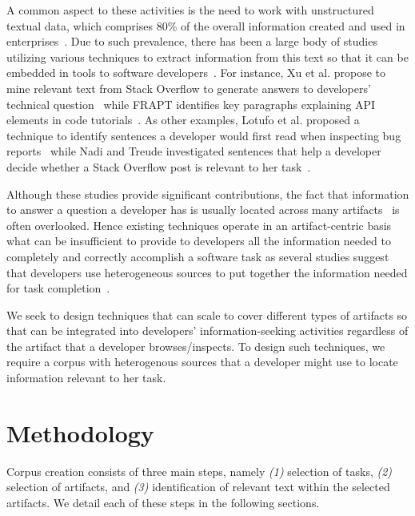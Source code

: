 A common aspect to these activities is the need to work with unstructured textual data, which comprises 80\% of the overall information created and used in enterprises~\cite{Bavota2014, holzinger2013}.
Due to such prevalence, there has been a large body of studies utilizing various techniques to extract
information from this text so that it can be embedded in
tools to software developers~\cite{Bavota2014, Xu2017, Robillard2015, Lotufo2012}. For instance, Xu et al. propose to mine relevant text from Stack Overflow
to generate answers to developers' technical question~\cite{Xu2017}
while FRAPT identifies key paragraphs explaining API elements in code tutorials~\cite{Jiang2017}.
As other examples, Lotufo et al. proposed a technique to identify sentences a developer would first read when inspecting bug reports~\cite{Lotufo2012} while Nadi and Treude investigated sentences that help a developer decide whether a Stack Overflow post is relevant to her task~\cite{nadi2020}.




Although these studies provide significant contributions, the fact that information to answer a question a developer has is usually located across many artifacts~\cite{Rastkar2013t} is often overlooked.
Hence existing techniques operate in an artifact-centric basis
what can be insufficient to provide to developers all the information needed
to completely and correctly accomplish a software task as several studies suggest that developers use heterogeneous sources to put together the information needed for task completion~\cite{josyula2018, Li2013, rao2020}.




We seek to design techniques that can scale to cover different types of artifacts
so that can be integrated into developers' information-seeking activities regardless of the artifact that a developer browses/inspects.
To design such techniques, we require a corpus with heterogenous sources that a developer
might use to locate information relevant to her task.









\section{Methodology}
\label{cp4:methodology}

Corpus creation consists of three main steps, namely \textit{(1)} selection of tasks, \textit{(2)} selection of artifacts, and \textit{(3)} identification of relevant text within the selected artifacts. We detail each of these steps in the following sections.




